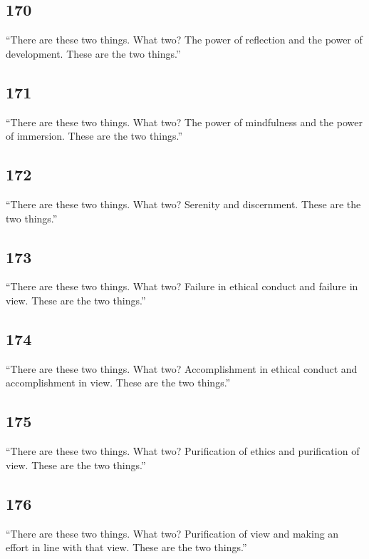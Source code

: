 \documentclass[12pt,openany]{book}%
\begin{document}
\subsection*{170 }

“There are these two things. What two? The power of reflection and the power of development. These are the two things.” 

\subsection*{171 }

“There are these two things. What two? The power of mindfulness and the power of immersion. These are the two things.” 

\subsection*{172 }

“There are these two things. What two? Serenity and discernment. These are the two things.” 

\subsection*{173 }

“There are these two things. What two? Failure in ethical conduct and failure in view. These are the two things.” 

\subsection*{174 }

“There are these two things. What two? Accomplishment in ethical conduct and accomplishment in view. These are the two things.” 

\subsection*{175 }

“There are these two things. What two? Purification of ethics and purification of view. These are the two things.” 

\subsection*{176 }

“There are these two things. What two? Purification of view and making an effort in line with that view. These are the two things.” 
\end{document}
